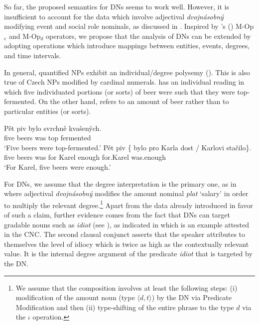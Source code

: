 \documentclass[output=paper,
modfonts,
hidelinks,
newtxmath
]{langscibook}
\begin{document}
So far, the proposed semantics for DNs seems to work well. However, it is insufficient to account for the data which involve adjectival \textit{dvojnásobný} modifying event and social role nominals, as discussed in . Inspired by \citeauthor{rett_polysemy_2014}'s (\citeyear{rett_polysemy_2014}) M-Op\(_{e}\) and M-Op\(_{d}\) operators, we propose that the analysis of DNs can be extended by adopting operations which introduce mappings between entities, events, degrees, and time intervals.

In general, quantified NPs exhibit an individual/degree polysemy (\citealt{rett_polysemy_2014}). This is also true of Czech NPs modified by cardinal numerals.  has an individual reading in which five individuated portions (or sorts) of beer were such that they were top-fermented. On the other hand,  refers to an amount of beer rather than to particular entities (or sorts).

\ea \ea \gll Pět piv bylo svrchně kvašených.\label{individual-reading}\\
five beers was top fermented\\
\glt `Five beers were top-fermented.'
\ex \gll Pět piv \{\hspace{-2pt} bylo pro Karla dost / Karlovi stačilo\}.\label{degree-reading}\\
five beers {} was for Karel enough {} for.Karel was.enough\\
\glt `For Karel, five beers were enough.'
\z \z

\noindent For DNs, we assume that the degree interpretation is the primary one, as in  where adjectival \textit{dvojnásobný} modifies the amount nominal \textit{plat} `salary' in order to multiply the relevant degree.\footnote{We assume that the composition involves at least the following steps: (i) modification of the amount noun (type $\langle d,t\rangle$) by the DN via Predicate Modification and then (ii) type-shifting of the entire phrase to the type $d$ via the $\iota$ operation.} Apart from the data already introduced in favor of such a claim, further evidence comes from the fact that DNs can target gradable nouns such as \textit{idiot} (see \citealt{morzycki2009degree}), as indicated in  which is an example attested in the CNC. The second clausal conjunct asserts that the speaker attributes to themselves the level of idiocy which is twice as high as the contextually relevant value. It is the internal degree argument of the predicate \textit{idiot} that is targeted by the DN.
\end{document}

